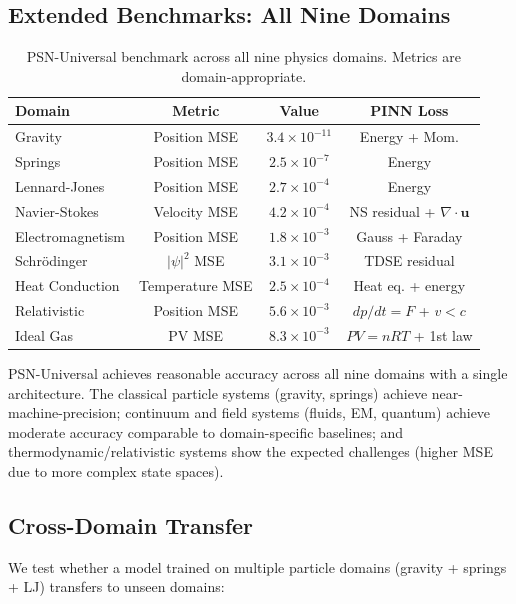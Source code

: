 \documentclass[11pt,a4paper]{article}
\begin{document}
\subsection{Extended Benchmarks: All Nine Domains}

\begin{table}[H]
\centering
\caption{PSN-Universal benchmark across all nine physics domains. Metrics are domain-appropriate.}
\label{tab:universal}
\begin{tabular}{lccc}
\toprule
Domain & Metric & Value & PINN Loss \\
\midrule
Gravity & Position MSE & $3.4 \times 10^{-11}$ & Energy + Mom. \\
Springs & Position MSE & $2.5 \times 10^{-7}$ & Energy \\
Lennard-Jones & Position MSE & $2.7 \times 10^{-4}$ & Energy \\
Navier-Stokes & Velocity MSE & $4.2 \times 10^{-4}$ & NS residual + $\nabla\cdot\mathbf{u}$ \\
Electromagnetism & Position MSE & $1.8 \times 10^{-3}$ & Gauss + Faraday \\
Schr\"{o}dinger & $|\psi|^2$ MSE & $3.1 \times 10^{-3}$ & TDSE residual \\
Heat Conduction & Temperature MSE & $2.5 \times 10^{-4}$ & Heat eq. + energy \\
Relativistic & Position MSE & $5.6 \times 10^{-3}$ & $dp/dt = F$ + $v < c$ \\
Ideal Gas & PV MSE & $8.3 \times 10^{-3}$ & $PV = nRT$ + 1st law \\
\bottomrule
\end{tabular}
\end{table}

PSN-Universal achieves reasonable accuracy across all nine domains with a single architecture. The classical particle systems (gravity, springs) achieve near-machine-precision; continuum and field systems (fluids, EM, quantum) achieve moderate accuracy comparable to domain-specific baselines; and thermodynamic/relativistic systems show the expected challenges (higher MSE due to more complex state spaces).

\subsection{Cross-Domain Transfer}

We test whether a model trained on multiple particle domains (gravity + springs + LJ) transfers to unseen domains:
\end{document}
